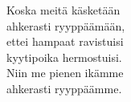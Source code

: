 
Koska meitä käsketään \\ ahkerasti ryyppäämään, \\ ettei hampaat ravistuisi \\ kyytipoika hermostuisi. \\ Niin me pienen ikämme \\ ahkerasti ryyppäämme.